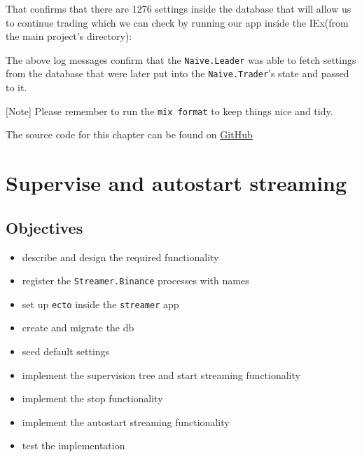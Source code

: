 \documentclass[
  oneside]{book}
\newenvironment{Shaded}{\begin{snugshade}}{\end{snugshade}}
\newcommand{\AttributeTok}[1]{\textcolor[rgb]{0.13,0.29,0.53}{#1}}
\newcommand{\CommentTok}[1]{\textcolor[rgb]{0.56,0.35,0.01}{\textit{#1}}}
\newcommand{\ControlFlowTok}[1]{\textcolor[rgb]{0.13,0.29,0.53}{\textbf{#1}}}
\newcommand{\ErrorTok}[1]{\textcolor[rgb]{0.64,0.00,0.00}{\textbf{#1}}}
\newcommand{\ExtensionTok}[1]{#1}
\newcommand{\KeywordTok}[1]{\textcolor[rgb]{0.13,0.29,0.53}{\textbf{#1}}}
\newcommand{\NormalTok}[1]{#1}
\newcommand{\OperatorTok}[1]{\textcolor[rgb]{0.81,0.36,0.00}{\textbf{#1}}}
\newcommand{\PreprocessorTok}[1]{\textcolor[rgb]{0.56,0.35,0.01}{\textit{#1}}}
\newcommand{\SpecialStringTok}[1]{\textcolor[rgb]{0.31,0.60,0.02}{#1}}
\newcommand{\StringTok}[1]{\textcolor[rgb]{0.31,0.60,0.02}{#1}}
\providecommand{\tightlist}{%
  \setlength{\itemsep}{0pt}\setlength{\parskip}{0pt}}
\begin{document}
That confirms that there are 1276 settings inside the database that will allow us to continue trading which we can check by running our app inside the IEx(from the main project's directory):

\begin{Shaded}
\end{Shaded}

The above log messages confirm that the \texttt{Naive.Leader} was able to fetch settings from the database that were later put into the \texttt{Naive.Trader}'s state and passed to it.

{[}Note{]} Please remember to run the \texttt{mix\ format} to keep things nice and tidy.

The source code for this chapter can be found on \href{https://github.com/Cinderella-Man/hands-on-elixir-and-otp-cryptocurrency-trading-bot-source-code/tree/chapter_10}{GitHub}

\chapter{Supervise and autostart streaming}\label{supervise-and-autostart-streaming}

\section{Objectives}\label{objectives-10}

\begin{itemize}
\tightlist
\item
  describe and design the required functionality
\item
  register the \texttt{Streamer.Binance} processes with names
\item
  set up \texttt{ecto} inside the \texttt{streamer} app
\item
  create and migrate the db
\item
  seed default settings
\item
  implement the supervision tree and start streaming functionality
\item
  implement the stop functionality
\item
  implement the autostart streaming functionality
\item
  test the implementation
\end{itemize}
\end{document}
